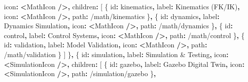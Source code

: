 \documentclass[
]{article}
\newenvironment{Shaded}{\begin{snugshade}}{\end{snugshade}}
\newcommand{\NormalTok}[1]{#1}
\newcommand{\OperatorTok}[1]{\textcolor[rgb]{0.81,0.36,0.00}{\textbf{#1}}}
\newcommand{\StringTok}[1]{\textcolor[rgb]{0.31,0.60,0.02}{#1}}
\begin{document}
\begin{Shaded}
\begin{Highlighting}[]
\NormalTok{    icon}\OperatorTok{:} \OperatorTok{\textless{}}\NormalTok{MathIcon }\OperatorTok{/\textgreater{},}
\NormalTok{    children}\OperatorTok{:}\NormalTok{ [}
\NormalTok{      \{ id}\OperatorTok{:} \StringTok{\textquotesingle{}kinematics\textquotesingle{}}\OperatorTok{,}\NormalTok{ label}\OperatorTok{:} \StringTok{\textquotesingle{}Kinematics (FK/IK)\textquotesingle{}}\OperatorTok{,}\NormalTok{ icon}\OperatorTok{:} \OperatorTok{\textless{}}\NormalTok{MathIcon }\OperatorTok{/\textgreater{},}\NormalTok{ path}\OperatorTok{:} \StringTok{\textquotesingle{}/math/kinematics\textquotesingle{}}\NormalTok{ \}}\OperatorTok{,}
\NormalTok{      \{ id}\OperatorTok{:} \StringTok{\textquotesingle{}dynamics\textquotesingle{}}\OperatorTok{,}\NormalTok{ label}\OperatorTok{:} \StringTok{\textquotesingle{}Dynamics Simulation\textquotesingle{}}\OperatorTok{,}\NormalTok{ icon}\OperatorTok{:} \OperatorTok{\textless{}}\NormalTok{MathIcon }\OperatorTok{/\textgreater{},}\NormalTok{ path}\OperatorTok{:} \StringTok{\textquotesingle{}/math/dynamics\textquotesingle{}}\NormalTok{ \}}\OperatorTok{,}
\NormalTok{      \{ id}\OperatorTok{:} \StringTok{\textquotesingle{}control\textquotesingle{}}\OperatorTok{,}\NormalTok{ label}\OperatorTok{:} \StringTok{\textquotesingle{}Control Systems\textquotesingle{}}\OperatorTok{,}\NormalTok{ icon}\OperatorTok{:} \OperatorTok{\textless{}}\NormalTok{MathIcon }\OperatorTok{/\textgreater{},}\NormalTok{ path}\OperatorTok{:} \StringTok{\textquotesingle{}/math/control\textquotesingle{}}\NormalTok{ \}}\OperatorTok{,}
\NormalTok{      \{ id}\OperatorTok{:} \StringTok{\textquotesingle{}validation\textquotesingle{}}\OperatorTok{,}\NormalTok{ label}\OperatorTok{:} \StringTok{\textquotesingle{}Model Validation\textquotesingle{}}\OperatorTok{,}\NormalTok{ icon}\OperatorTok{:} \OperatorTok{\textless{}}\NormalTok{MathIcon }\OperatorTok{/\textgreater{},}\NormalTok{ path}\OperatorTok{:} \StringTok{\textquotesingle{}/math/validation\textquotesingle{}}\NormalTok{ \}}
\NormalTok{    ]}
\NormalTok{  \}}\OperatorTok{,}
\NormalTok{  \{}
\NormalTok{    id}\OperatorTok{:} \StringTok{\textquotesingle{}simulation\textquotesingle{}}\OperatorTok{,}
\NormalTok{    label}\OperatorTok{:} \StringTok{\textquotesingle{}Simulation \& Testing\textquotesingle{}}\OperatorTok{,}
\NormalTok{    icon}\OperatorTok{:} \OperatorTok{\textless{}}\NormalTok{SimulationIcon }\OperatorTok{/\textgreater{},}
\NormalTok{    children}\OperatorTok{:}\NormalTok{ [}
\NormalTok{      \{ id}\OperatorTok{:} \StringTok{\textquotesingle{}gazebo\textquotesingle{}}\OperatorTok{,}\NormalTok{ label}\OperatorTok{:} \StringTok{\textquotesingle{}Gazebo Digital Twin\textquotesingle{}}\OperatorTok{,}\NormalTok{ icon}\OperatorTok{:} \OperatorTok{\textless{}}\NormalTok{SimulationIcon }\OperatorTok{/\textgreater{},}\NormalTok{ path}\OperatorTok{:} \StringTok{\textquotesingle{}/simulation/gazebo\textquotesingle{}}\NormalTok{ \}}\OperatorTok{,}

\end{Highlighting}
\end{Shaded}
\end{document}
